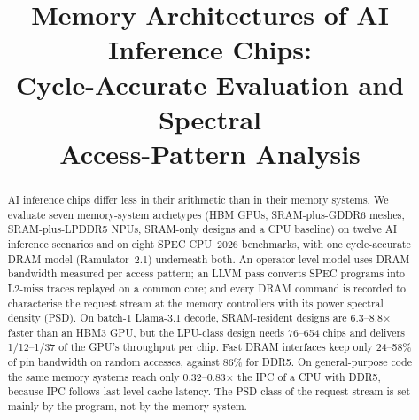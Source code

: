 \documentclass[conference]{IEEEtran}
\makeatletter
\newcommand{\tmx}{\ensuremath{\times}}
\newcommand{\linebreakand}{%
  \end{@IEEEauthorhalign}
  \hfill\mbox{}\par\vspace{10pt}
  \mbox{}\hfill\begin{@IEEEauthorhalign}
}
\makeatother
\begin{document}
\title{Memory Architectures of AI Inference Chips:\\
Cycle-Accurate Evaluation and Spectral\\ Access-Pattern Analysis}

\author{}

\maketitle

\begin{abstract}
AI inference chips differ less in their arithmetic than in their memory systems. We evaluate seven memory-system archetypes (HBM GPUs, SRAM-plus-GDDR6 meshes, SRAM-plus-LPDDR5 NPUs, SRAM-only designs and a CPU baseline) on twelve AI inference scenarios and on eight SPEC CPU~2026 benchmarks, with one cycle-accurate DRAM model (Ramulator~2.1) underneath both. An operator-level model uses DRAM bandwidth measured per access pattern; an LLVM pass converts SPEC programs into L2-miss traces replayed on a common core; and every DRAM command is recorded to characterise the request stream at the memory controllers with its power spectral density (PSD). On batch-1 Llama-3.1 decode, SRAM-resident designs are 6.3--8.8\tmx{} faster than an HBM3 GPU, but the LPU-class design needs 76--654 chips and delivers 1/12--1/37 of the GPU's throughput per chip. Fast DRAM interfaces keep only 24--58\% of pin bandwidth on random accesses, against 86\% for DDR5. On general-purpose code the same memory systems reach only 0.32--0.83\tmx{} the IPC of a CPU with DDR5, because IPC follows last-level-cache latency. The PSD class of the request stream is set mainly by the program, not by the memory system.
\end{abstract}
\end{document}
